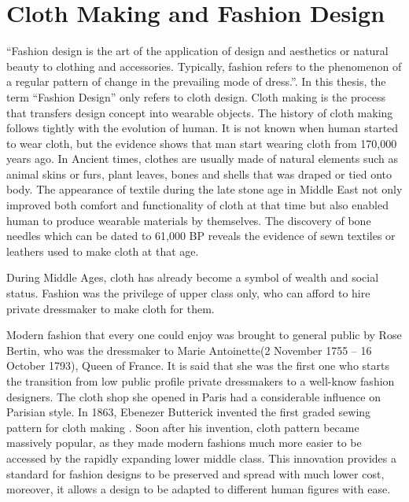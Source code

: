 \section{Cloth Making and Fashion Design}
``Fashion design is the art of the application of design and aesthetics or natural beauty to clothing and accessories. Typically, fashion refers to the phenomenon of a regular pattern of change in the prevailing mode of dress.''. In this thesis, the term ``Fashion Design'' only refers to cloth design. Cloth making is the process that transfers design concept into wearable objects. The history of cloth making follows tightly with the evolution of human. It is not known when human started to wear cloth, but the evidence shows that man start wearing cloth from 170,000 years ago. In Ancient times, clothes are usually made of natural elements such as animal skins or furs, plant leaves, bones and shells that was draped or tied onto body. The appearance of textile during the late stone age in Middle East not only improved both comfort and functionality of cloth at that time but also enabled human to produce wearable materials by themselves. The discovery of bone needles which can be dated to 61,000 BP reveals the evidence of sewn textiles or leathers used to make cloth at that age. 

During Middle Ages, cloth has already become a symbol of wealth and social status. Fashion was the privilege of upper class only, who can afford to hire private dressmaker to make cloth for them. 

Modern fashion that every one could enjoy was brought to general public by Rose Bertin, who was the dressmaker to Marie Antoinette(2 November 1755 – 16 October 1793), Queen of France. It is said that she was the first one who starts the transition from low public profile private dressmakers to a well-know fashion designers.  The cloth shop she opened in Paris had a considerable influence on Parisian style. In 1863, Ebenezer Butterick invented the first graded sewing pattern for cloth making . Soon after his invention, cloth pattern became massively popular, as they made modern fashions much more easier to be accessed by the rapidly expanding lower middle class. This innovation provides a standard for fashion designs to be preserved and spread with much lower cost, moreover, it allows a design to be adapted to different human figures with ease. 

